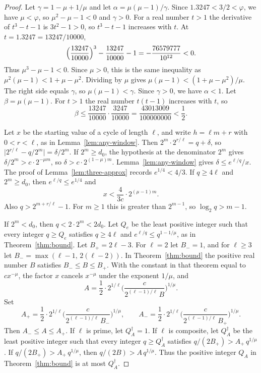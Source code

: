 \documentclass[11pt]{article}
\begin{document}
\begin{proof}
Let $\gamma = 1 - \mu + 1/\mu$ and let $\alpha = \mu(\mu - 1)/\gamma$.
Since $1.3247 < 3/2 < \varphi$, we have $\mu < \varphi$, so $\mu^2 - \mu - 1 < 0$ and $\gamma > 0$.
For a real number $t > 1$ the derivative of $t^3 - t - 1$ is $3t^2 - 1 > 0$, so $t^3 - t - 1$ increases with $t$.
At $t = 1.3247 = 13247/10000$,
\[
\Bigl(\frac{13247}{10000}\Bigr)^3 - \frac{13247}{10000} - 1 = -\frac{76579777}{10^{12}} < 0.
\]
Thus $\mu^3 - \mu - 1 < 0$.
Since $\mu > 0$, this is the same inequality as $\mu^2(\mu - 1) < 1 + \mu - \mu^2$.
Dividing by $\mu$ gives $\mu(\mu - 1) < (1 + \mu - \mu^2)/\mu$.
The right side equals $\gamma$, so $\mu(\mu - 1) < \gamma$.
Since $\gamma > 0$, we have $\alpha < 1$.
Let $\beta = \mu(\mu - 1)$.
For $t > 1$ the real number $t(t - 1)$ increases with $t$, so
\[
\beta \le \frac{13247}{10000} \cdot \frac{3247}{10000} = \frac{43013009}{100000000} < \frac12.
\]

Let $x$ be the starting value of a cycle of length $\ell$, and write $h = \ell m + r$ with $0 < r < \ell$, as in Lemma~\ref{lem:any-window}.
Then $2^m \cdot 2^{r/\ell} = q + \delta$, so $\lvert 2^{r/\ell} - q/2^m \rvert = \delta/2^m$.
If $2^m \ge d_0$, the hypothesis at the denominator $2^m$ gives $\delta/2^m > c \cdot 2^{-\mu m}$, so $\delta > c \cdot 2^{(1-\mu)m}$.
Lemma~\ref{lem:any-window} gives $\delta \le e^{\ell/q}/x$.
The proof of Lemma~\ref{lem:three-approx} records $e^{1/4} < 4/3$.
If $q \ge 4\ell$ and $2^m \ge d_0$, then $e^{\ell/q} \le e^{1/4}$ and
\[
x < \frac{4}{3c} \cdot 2^{(\mu-1)m}.
\]
Also $q > 2^{m + r/\ell} - 1$.
For $m \ge 1$ this is greater than $2^{m-1}$, so $\log_2 q > m - 1$.

If $2^m < d_0$, then $q < 2 \cdot 2^m < 2d_0$.
Let $Q_e$ be the least positive integer such that every integer $q \ge Q_e$ satisfies $q \ge 4\ell$ and $e^{\ell/q} \le q^{1 - 1/\mu}$, as in Theorem~\ref{thm:bound}.
Let $B_+ = 2\ell - 3$.
For $\ell = 2$ let $B_- = 1$, and for $\ell \ge 3$ let $B_- = \max(\ell - 1,\, 2(\ell - 2))$.
In Theorem~\ref{thm:bound} the positive real number $B$ satisfies $B_- \le B \le B_+$.
With the constant in that theorem equal to $c x^{-\mu}$, the factor $x$ cancels $x^{-\mu}$ under the exponent $1/\mu$, and
\[
A = \frac12 \cdot 2^{1/\ell}
\Biggl( \frac{c}{2^{(\ell-1)/\ell}\, B} \Biggr)^{1/\mu}.
\]
Set
\[
A_+ = \frac12 \cdot 2^{1/\ell}
\Biggl( \frac{c}{2^{(\ell-1)/\ell}\, B_-} \Biggr)^{1/\mu},
\qquad
A_- = \frac12 \cdot 2^{1/\ell}
\Biggl( \frac{c}{2^{(\ell-1)/\ell}\, B_+} \Biggr)^{1/\mu}.
\]
Then $A_- \le A \le A_+$.
If $\ell$ is prime, let $Q_A^\dagger = 1$.
If $\ell$ is composite, let $Q_A^\dagger$ be the least positive integer such that every integer $q \ge Q_A^\dagger$ satisfies $q/(2B_+) > A_+ \, q^{1/\mu}$.
If $q/(2B_+) > A_+ \, q^{1/\mu}$, then $q/(2B) > A \, q^{1/\mu}$.
Thus the positive integer $Q_A$ in Theorem~\ref{thm:bound} is at most $Q_A^\dagger$.


\end{proof}
\end{document}
